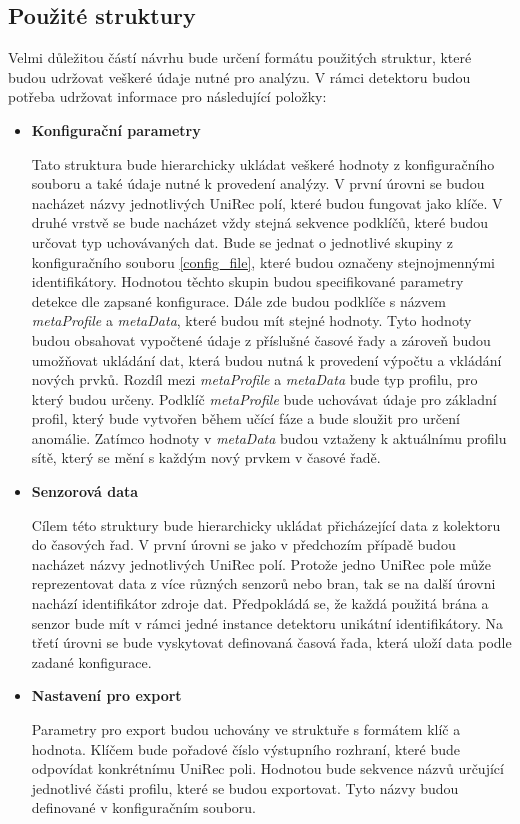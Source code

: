  \subsection{Použité struktury}
 Velmi důležitou částí návrhu bude určení formátu použitých struktur, které budou udržovat veškeré 
 údaje nutné pro analýzu. V rámci detektoru budou potřeba udržovat informace pro následující
 položky:
  \begin{itemize}
   \item \textbf{Konfigurační parametry}
   
   Tato struktura bude hierarchicky ukládat veškeré hodnoty z konfiguračního souboru
   a také údaje nutné k provedení analýzy. V první úrovni se budou nacházet názvy jednotlivých 
   UniRec polí, které budou fungovat jako klíče. V druhé vrstvě se bude nacházet vždy stejná 
   sekvence podklíčů, které budou určovat typ uchovávaných dat. Bude se jednat o jednotlivé 
   skupiny z konfiguračního souboru \ref{config_file}, které budou označeny stejnojmennými
   identifikátory. Hodnotou těchto skupin budou specifikované parametry detekce dle zapsané
   konfigurace. Dále zde budou podklíče s názvem \textit{metaProfile} a \textit{metaData},
   které budou mít
   stejné hodnoty. Tyto hodnoty budou obsahovat vypočtené údaje z příslušné časové řady
   a zároveň budou umožňovat ukládání dat, která budou nutná k provedení výpočtu 
   a vkládání nových prvků. Rozdíl mezi \textit{metaProfile} a \textit{metaData} bude typ profilu,
   pro který budou určeny. Podklíč \textit{metaProfile} bude uchovávat údaje pro základní profil,
   který bude vytvořen během učící fáze a bude sloužit pro určení anomálie. Zatímco 
   hodnoty v \textit{metaData} budou vztaženy k aktuálnímu profilu sítě, který se mění s každým
   nový prvkem v časové řadě.
   
   \item \textbf{Senzorová data}
   
   Cílem této struktury bude hierarchicky ukládat přicházející data z kolektoru do časových řad. 
   V první úrovni se jako v předchozím případě budou nacházet názvy jednotlivých UniRec polí. 
   Protože jedno UniRec pole může reprezentovat data z více různých senzorů nebo bran, tak se na 
   další úrovni nachází identifikátor zdroje dat. Předpokládá se, že každá použitá brána a senzor 
   bude mít v rámci jedné instance detektoru unikátní identifikátory. Na třetí úrovni se bude vyskytovat 
   definovaná časová řada, která uloží data podle zadané konfigurace.
   
   \item \textbf{Nastavení pro export} 
   
   Parametry pro export budou uchovány ve struktuře s formátem klíč a hodnota. Klíčem bude 
   pořadové číslo výstupního rozhraní, které bude odpovídat konkrétnímu UniRec poli. Hodnotou 
   bude sekvence názvů určující jednotlivé části profilu, které se budou exportovat. Tyto názvy
   budou definované v konfiguračním souboru. 
   
  \end{itemize}

